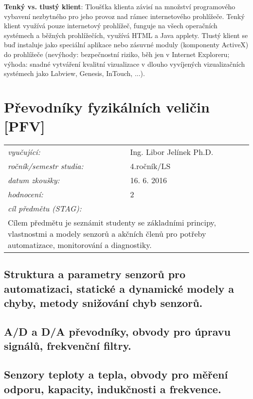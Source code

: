 \textbf{Tenký vs. tlustý klient}: Tloušťka klienta závisí na množství programového vybavení nezbytného pro jeho provoz nad rámec internetového prohlížeče. Tenký klient využívá pouze internetový prohlížeč, funguje na všech operačních systémech a běžných prohlížečích, využívá HTML a Java applety. Tlustý klient se buď instaluje jako speciální aplikace nebo zásuvné moduly (komponenty ActiveX) do prohlížeče (nevýhody: bezpečnostní riziko, běh jen v Internet Exploreru; výhoda: snadné vytváření kvalitní vizualizace v dlouho vyvíjených vizualizačních systémech jako Labview, Genesis, InTouch, ...).

\newpage
\section{Převodníky fyzikálních veličin [PFV]}

\begin{table}[H]
\centering
\begin{tabular}{p{4cm} p{12cm}}
\textit{vyučující:}             & Ing. Libor Jelínek Ph.D. \\
\textit{ročník/semestr studia:} & 4.ročník/LS \\
\textit{datum zkoušky:}         & 16. 6. 2016 \\
\textit{hodnocení:}             & 2 \\
\textit{cíl předmětu (STAG):}   & \\
\multicolumn{2}{p{16cm}}{Cílem předmětu je seznámit studenty se základními principy, vlastnostmi a modely senzorů a akčních členů pro potřeby automatizace, monitorování a diagnostiky.}
\end{tabular}
\end{table}

\subsection{Struktura a parametry senzorů pro automatizaci, statické a dynamické modely a chyby, metody snižování chyb senzorů.}

\newpage
\subsection{A/D a D/A převodníky, obvody pro úpravu signálů, frekvenční filtry.}

\newpage
\subsection{Senzory teploty a tepla, obvody pro měření odporu, kapacity, indukčnosti a frekvence.}


